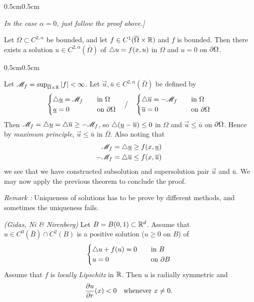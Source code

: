 \documentclass[12pt,a4paper]{article}
\newenvironment{proof}
{\begin{changemargin}{0.5cm}{0.5cm} 
	}%
	{\end{changemargin}
}
\newenvironment{p}
{\begin{proof} 
	}%
	{\end{proof}
}
\begin{document}
\begin{p}
\emph{In the case $\alpha =0$, just follow the proof above.]}

\eop
\end{p}
\s


\corr Let $\Omega \subset C^{2, \alpha}$ be bounded, and let $f\in C^1(\overline{\Omega} \times \mathbb{R})$ and $f$ is bounded. Then there exists a solution $u \in C^{2, \alpha}(\bar{\Omega})$ of $\triangle u = f(x, u)$ in $\Omega$ and $u=0$ on $\partial \Omega$.
\begin{p}
\pf Let $\mathscr{M}_f = \sup_{\overline{\Omega}\times \mathbb{R}} |f| <\infty$. Let $\vec{u}, \bar{u} \in C^{2, \alpha}(\bar{\Omega})$ be defined by
\begin{align*}
\begin{cases}
\triangle \underline{u} = \mathscr{M}_f \quad & \text{in } \Omega\\
\underline{u} = 0 \quad & \text{on }\partial \Omega
\end{cases} \quad / \quad \begin{cases}
\triangle \overline{u} = -\mathscr{M}_f \quad & \text{in } \Omega\\
\overline{u} = 0 \quad & \text{on }\partial \Omega
\end{cases}
\end{align*}
Then $\mathscr{M}_f = \triangle \underline{u} = \triangle \overline{u} \geq - \mathscr{M}_f$, so $\triangle(\underline{u} - \overline{u})\leq 0$ in $\Omega$ and $\vec{u} \leq \bar{u}$ on $\partial \Omega$. Hence by \emph{maximum principle}, $\vec{u}\leq \bar{u}$ in $\bar{\Omega}$. Also noting that
\begin{align*}
\mathscr{M}_f  = \triangle \underline{u}\geq f(x, \underline{u}) \\
- \mathscr{M}_f = \triangle \overline{u} \leq f(x, \overline{u})
\end{align*}
we see that we have constructed subsolution and supersolution pair $\vec{u}$ and $\bar{u}$. We may now apply the previous theorem to conclude the proof.

\eop
\end{p}
\s

\emph{Remark :} Uniqueness of solutions has to be prove by different methods, and sometimes the uniqueness fails.
\s

\thm \emph{(Gidas, Ni \& Nirenberg)} Let $B= B(0,1) \subset \mathbb{R}^d$. Assume that $u\in C^0(\bar{B})\cap C^2(B)$ is a positive solution ($u\geq 0$ on $B$) of
\begin{align*}
\begin{cases}
\triangle u + f(u) =0 \quad & \text{in }B\\
u = 0 \quad & \text{on }\partial B
\end{cases}
\end{align*}
Assume that $f$ is \emph{locally Lipschitz} in $\mathbb{R}$. Then $u$ is radially symmetric and 
\begin{align*}
\frac{\partial u}{\partial r}(x) < 0 \quad \text{whenever } x\neq 0.
\end{align*}
\s
\end{document}
